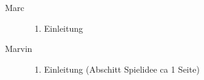 \begin{description}
	\item[Marc]{
		\begin{enumerate}
			\item{ Einleitung }
		\end{enumerate}
	}
	\item[Marvin]{
		\begin{enumerate}
			\item{ Einleitung (Abschitt Spielidee ca 1 Seite) }
		\end{enumerate}
	}
\end{description}
